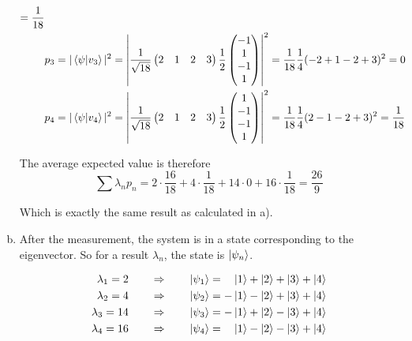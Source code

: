 \documentclass[a4paper,german,12pt,smallheadings]{scrartcl}
\begin{document}
\begin{enumerate}[a)]
\begin{align*}
      = \frac{1}{18} \\
      &p_3
      = |\braket{\psi|v_3}|^2
      = \left| \frac{1}{\sqrt{18}}
        \begin{pmatrix} 2 & 1 & 2 & 3 \end{pmatrix}
         \frac{1}{2} \begin{pmatrix}-1 \\ 1 \\ -1 \\ 1\end{pmatrix} \right|^2
      = \frac{1}{18} \frac{1}{4} (-2+1-2+3)^2
      = 0 \\
      &p_4
      = |\braket{\psi|v_4}|^2
      = \left| \frac{1}{\sqrt{18}}
        \begin{pmatrix} 2 & 1 & 2 & 3 \end{pmatrix}
         \frac{1}{2} \begin{pmatrix}1 \\ -1 \\ -1 \\ 1\end{pmatrix} \right|^2
      = \frac{1}{18} \frac{1}{4} (2-1-2+3)^2
      = \frac{1}{18}
    \end{align*}

    The average expected value is therefore
    \begin{equation*}
      \sum \lambda_n p_n = 2 \cdot \frac{16}{18} + 4 \cdot \frac{1}{18} + 14 \cdot 0 + 16 \cdot \frac{1}{18} = \frac{26}{9}
    \end{equation*}

    Which is exactly the same result as calculated in a).

  \item
    After the measurement, the system is in a state corresponding to the
    eigenvector. So for a result $\lambda_n$, the state is $\ket{\psi_n}$.

    \begin{align*}
      \lambda_1 =  2 \qquad &\Rightarrow \qquad \ket{\psi_1} =  \phantom{-}\ket{1} + \ket{2} + \ket{3} + \ket{4} \\
      \lambda_2 =  4 \qquad &\Rightarrow \qquad \ket{\psi_2} = -\ket{1} - \ket{2} + \ket{3} + \ket{4} \\
      \lambda_3 = 14 \qquad &\Rightarrow \qquad \ket{\psi_3} = -\ket{1} + \ket{2} - \ket{3} + \ket{4} \\
      \lambda_4 = 16 \qquad &\Rightarrow \qquad \ket{\psi_4} =  \phantom{-}\ket{1} - \ket{2} - \ket{3} + \ket{4} \\
    \end{align*}

\end{enumerate}
\end{document}
